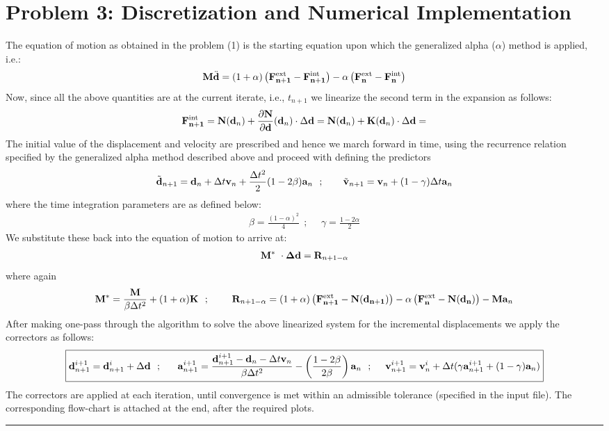 \section*{Problem 3: Discretization and Numerical Implementation}
The equation of motion as obtained in the problem (1) is the starting equation upon which the generalized alpha ($\alpha$) method is applied, i.e.: 
\begin{align*}
{\bf M} \ddot{\bf d}
=
(1+\alpha)
\left(
\bf\F{n+1}{ext} - \F{n+1}{int}
\right)
- \alpha 
\left(
\bf\F{n}{ext} - \F{n}{int}
\right)
\end{align*}
Now, since all the above quantities are at the current iterate, i.e., $t_{n+1}$ we linearize the second term in the expansion as follows: 
\begin{align*}
{\bf \F{n+1}{int}}
=
{\bf N}({\bf d}_{n})
+
\del{\bf N}{\bf d}({\bf d}_n) \cdot\Delta {\bf d} = 
{\bf N}({\bf d}_{n})
+
{\bf K}({\bf d}_n) \cdot\Delta {\bf d} = 
\end{align*}
The initial value of the displacement and velocity are prescribed and hence we march forward in time, using the recurrence relation specified by the generalized alpha method described above and proceed with defining the predictors 
\begin{align*}
\tilde{\bf d}_{n+1}
=
{\bf d}_{n}
+
\Delta t {\bf v}_n
+ \frac{\Delta t^2}{2} (1-2\beta){\bf a}_n \ \ ; \ \ \ \ \ \ 
\tilde{\bf v}_{n+1}
=
{\bf v}_n
+
(1-\gamma)\Delta t {\bf a}_n
\end{align*}
where the time integration parameters are as defined below: 
\begin{align*}
\beta = \frac{(1-\alpha)^2}{4} \ \ ; \ \ \ \ \ \ \gamma = \frac{1-2\alpha}{2}
\end{align*}
We substitute these back into the equation of motion to arrive at: 
\begin{align*}
{\bf M}^*\ \cdot {\bf \Delta d} = {\bf R}_{n+1-\alpha}
\end{align*}
where again
\begin{align*}
{\bf M}^*
=
\frac{\bf M}{\beta\Delta t^2} + (1+\alpha){\bf K} \ \ ; \ \ \ \ \ \ \ 
{\bf R}_{n+1-\alpha}
=
(1+\alpha)
\left(
\bf\F{n+1}{ext} - {\bf N}({\bf d}_{n+1})
\right)
- \alpha 
\left(
\bf\F{n}{ext} - {\bf N}({\bf d}_n)
\right) - {\bf M} {\bf a}_n
\end{align*}
After making one-pass through the algorithm to solve the above linearized system for the incremental displacements we apply the correctors as follows: 
\begin{align*}
\boxed{{\bf d}^{i+1}_{n+1}
=
{\bf d}^i_{n+1} + \Delta {\bf d} \ \ ; \ \ \ \ \ 
{\bf a}^{i+1}_{n+1}
=
\frac{{\bf d}^{i+1}_{n+1} - {\bf d}_n - \Delta t {\bf v}_n}{\beta\Delta t^2}
-
\left(
\frac{1-2\beta}{2\beta}
\right) {\bf a}_n \ \ ; \ \ \ \ {\bf v}^{i+1}_{n+1}
=
{\bf v}^i_n
+ 
\Delta t
(\gamma {\bf a}^{i+1}_{n+1} + (1-\gamma){\bf a}_n)}
\end{align*}
The correctors are applied at each iteration, until convergence is met within an admissible tolerance (specified in the input file). The corresponding flow-chart is attached at the end, after the required plots. \\ \hrule 
